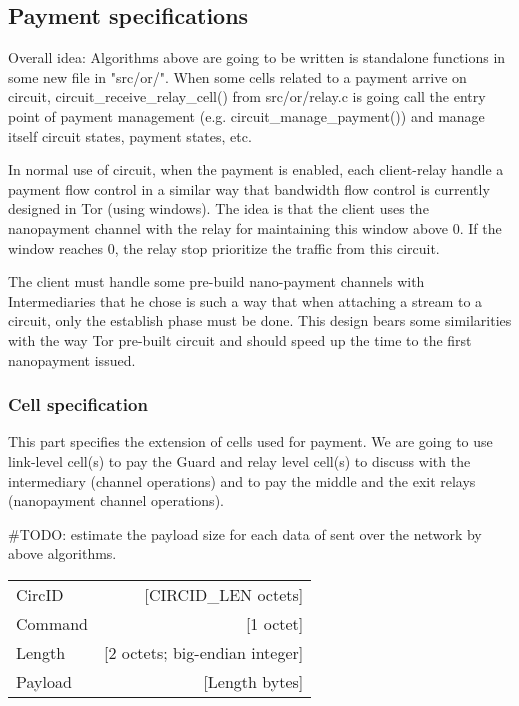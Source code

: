 \documentclass{article}
\begin{document}
\subsection{Payment specifications}
	\label{sec:payment_spec}
	
 Overall idea: Algorithms above are going to be written is standalone functions in some new file in "src/or/". When some cells related to a payment arrive on circuit, circuit\_receive\_relay\_cell() from src/or/relay.c is going call the entry point of payment management (e.g. circuit\_manage\_payment()) and manage itself circuit states, payment states, etc.

In normal use of circuit, when the payment is enabled, each client-relay handle a payment flow control in a similar way that bandwidth flow control is currently designed in Tor (using windows). The idea is that the client uses the nanopayment channel with the relay for maintaining this window above 0. If the window reaches 0, the relay stop prioritize the traffic from this circuit.

The client must handle some pre-build nano-payment channels with Intermediaries that he chose is such a way that when attaching a stream to a circuit, only the establish phase must be done. This design bears some similarities with the way Tor pre-built circuit and should speed up the time to the first nanopayment issued.
 \subsubsection{Cell specification}
 \label{sec:cell_spec}
 
 This part specifies the extension of cells used for payment. We are going to use link-level cell(s) to pay the Guard and relay level cell(s) to discuss with the intermediary (channel operations) and to pay the middle and the exit relays (nanopayment channel operations). 

 \#TODO: estimate the payload size for each data of sent over the network by above algorithms.
 
 \begin{center}
 \begin{tabular}{l r}
        CircID        &                        [CIRCID\_LEN octets] \\
        Command       &                        [1 octet] \\
        Length        &                        [2 octets; big-endian integer]\\
        Payload       &                        [Length bytes]\\

\end{tabular}\\
 \end{center}
\end{document}
